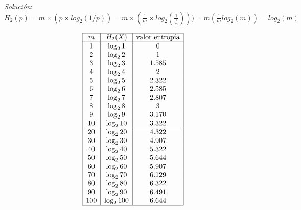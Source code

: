 \documentclass{beamer}
\begin{document}
\begin{frame}
\textit{\underline{Solución}}: \\
$H_2(p)	= m \times (p\times log_2(1/p)) = m \times (\frac{1}{m} \times log_2(\frac{1}{\frac{1}{m}})))  =  m ( \frac{1}{m} log_2(m)) =  log_2(m)$
\tiny
\noindent
\hspace{1cm}
\begin{minipage}[!ht]{0.4\textwidth}
\centering
\[
\begin{array}{|c|c|c|}
\hline
m & H_2(X) & \text{valor entropía} \\
\hline
1 & \log_2 1 & 0 \\
2 & \log_2 2 & 1 \\
3 & \log_2 3 & 1.585 \\
4 & \log_2 4 & 2 \\
5 & \log_2 5 & 2.322 \\
6 & \log_2 6 & 2.585 \\
7 & \log_2 7 & 2.807 \\
8 & \log_2 8 & 3 \\
9 & \log_2 9 & 3.170 \\
10 & \log_2 10 & 3.322 \\
\hline
20 & \log_2 20 & 4.322 \\
30 & \log_2 30 & 4.907 \\
40 & \log_2 40 & 5.322 \\
50 & \log_2 50 & 5.644 \\
60 & \log_2 60 & 5.907 \\
70 & \log_2 70 & 6.129 \\
80 & \log_2 80 & 6.322 \\
90 & \log_2 90 & 6.491 \\
100 & \log_2 100 & 6.644 \\
\hline
\end{array}
\]
\end{minipage}%
\hfill
\begin{minipage}[!ht]{0.4\textwidth}
\centering
{}
\end{minipage}
\end{frame} 

\end{document}
